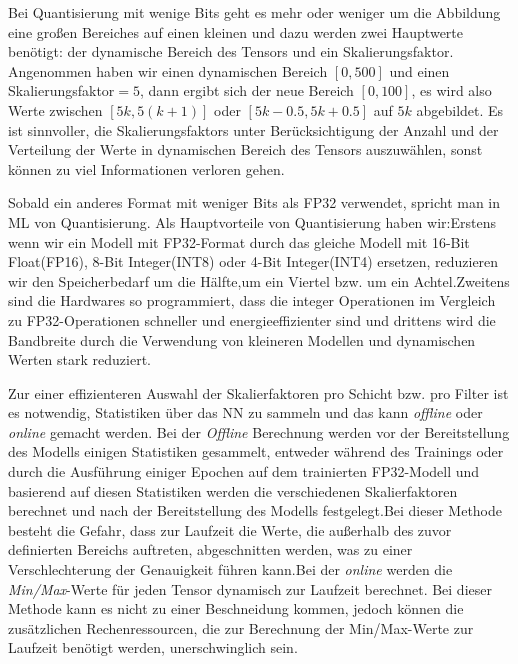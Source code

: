 \documentclass[12pt,a4paper]{scrartcl}
\numberwithin{equation}{section}
\begin{document}
Bei Quantisierung mit wenige Bits geht es mehr oder weniger um die Abbildung eine großen Bereiches auf einen kleinen und dazu werden zwei Hauptwerte benötigt: der dynamische Bereich des Tensors und ein Skalierungsfaktor. Angenommen haben wir einen dynamischen Bereich $ [0,500] $ und einen Skalierungsfaktor$= 5 $, dann ergibt sich der neue Bereich $ [0, 100] $, es wird also Werte zwischen $ [5k, 5(k+1)] $ oder $ [5k -0.5, 5k +0.5] $ auf $ 5k $ abgebildet. Es ist sinnvoller,  die Skalierungsfaktors unter Berücksichtigung der Anzahl und der Verteilung der Werte in dynamischen Bereich des Tensors auszuwählen, sonst können zu viel Informationen verloren gehen.

Sobald ein anderes Format mit weniger Bits als FP32 verwendet, spricht man in \ac{ML} von Quantisierung.
Als Hauptvorteile von Quantisierung haben wir:Erstens wenn wir ein Modell mit FP32-Format durch das gleiche Modell mit 16-Bit Float(FP16), 8-Bit Integer(INT8)  oder 4-Bit Integer(INT4)  ersetzen, reduzieren wir den Speicherbedarf um die Hälfte,um ein Viertel bzw. um ein Achtel.Zweitens sind die Hardwares so programmiert, dass die integer Operationen im Vergleich zu FP32-Operationen schneller und energieeffizienter sind und drittens wird die Bandbreite durch die Verwendung von kleineren Modellen und dynamischen Werten stark reduziert.
		
Zur einer effizienteren Auswahl der Skalierfaktoren pro Schicht bzw. pro Filter ist es notwendig, Statistiken  über das \ac{NN} zu sammeln und das kann \textit{offline} oder \textit{online} gemacht werden. Bei der \textit{Offline} Berechnung werden vor der Bereitstellung des Modells einigen Statistiken gesammelt, entweder während des Trainings oder durch die Ausführung einiger Epochen auf dem trainierten FP32-Modell und basierend auf diesen Statistiken werden die verschiedenen Skalierfaktoren berechnet und nach der Bereitstellung des Modells festgelegt.Bei dieser Methode besteht die Gefahr, dass zur Laufzeit die Werte, die außerhalb des zuvor definierten Bereichs auftreten, abgeschnitten werden, was zu einer Verschlechterung der Genauigkeit führen kann.Bei der \textit{online} werden die \textit{Min/Max}-Werte für jeden Tensor dynamisch zur Laufzeit berechnet. Bei dieser Methode kann es nicht zu einer Beschneidung kommen, jedoch können die zusätzlichen Rechenressourcen, die zur Berechnung der Min/Max-Werte zur Laufzeit benötigt werden, unerschwinglich sein.\cite{quantization1}
\end{document}
